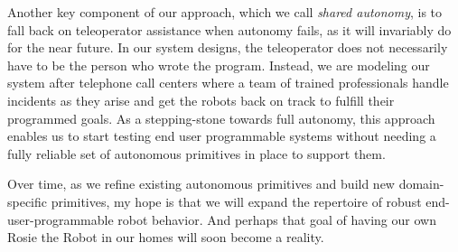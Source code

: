 \documentclass[11pt,twocolumn]{article}
\begin{document}
Another key component of our approach, which we call {\em shared autonomy}, is to fall back on teleoperator assistance when autonomy fails, as it will invariably do for the near future. In our system designs, the teleoperator does not necessarily have to be the person who wrote the program. Instead, we are modeling our system after telephone call centers where a team of trained professionals handle incidents as they arise and get the robots back on track to fulfill their programmed goals. As a stepping-stone towards full autonomy, this approach enables us to start testing end user programmable systems without needing a fully reliable set of autonomous primitives in place to support them.

Over time, as we refine existing autonomous primitives and build new domain-specific primitives, my hope is that we will expand the repertoire of robust end-user-programmable robot behavior. And perhaps that goal of having our own Rosie the Robot in our homes will soon become a reality.
\end{document}
